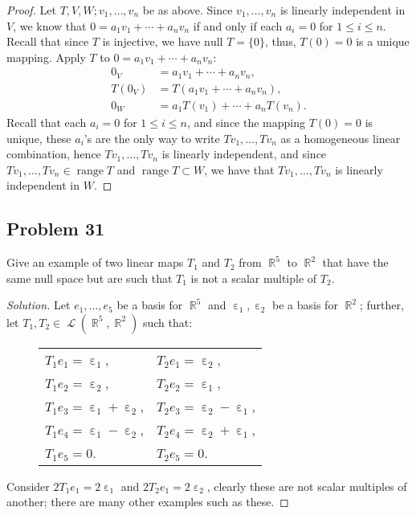 \documentclass[letterpaper, 12pt]{amsart}
\DeclareMathOperator{\R}{\mathbb{R}}
\renewcommand{\null}{\text{null }}
\DeclareMathOperator{\range}{\text{range }}
\DeclareMathOperator{\Ell}{\mathscr{L}}
\DeclareMathOperator{\ep}{\varepsilon}
\theoremstyle{definition}  %
\begin{document}
		\begin{proof}
		Let $T, V, W; v_{1}, \dots, v_{n}$ be as above.
		Since $v_{1}, \dots, v_{n}$ is linearly independent in $V$, we know that $0 = a_{1}v_{1} + \cdots + a_{n}v_{n}$ if and only if each $a_{i} = 0$ for $1 \leq i \leq n$.
		Recall that since $T$ is injective, we have $\null T = \{ 0 \}$, thus, $T(0) = 0$ is a unique mapping.
		Apply $T$ to $0 = a_{1}v_{1} + \cdots + a_{n}v_{n}$:
			\begin{align*}
				0_{V} &= a_{1}v_{1} + \cdots + a_{n}v_{n}, \\
				T(0_{V}) &= T(a_{1}v_{1} + \cdots + a_{n}v_{n}), \\
				0_{W} &= a_{1}T(v_{1}) + \cdots + a_{n}T(v_{n}).
			\end{align*}
		Recall that each $a_{i} = 0$ for $1 \leq i \leq n$, and since the mapping $T(0)=0$ is unique, these $a_{i}$'s are the only way to write $Tv_{1}, \dots, Tv_{n}$ as a homogeneous linear combination, hence $Tv_{1}, \dots, Tv_{n}$ is linearly independent, and since $Tv_{1}, \dots, Tv_{n} \in \range T$ and $\range T \subset W$, we have that $Tv_{1}, \dots, Tv_{n}$ is linearly independent in $W$.
		\end{proof}

		\subsection*{Problem 31}
		Give an example of two linear maps $T_{1}$ and $T_{2}$ from $\R^{5}$ to $\R^{2}$ that have the same null space but are such that $T_{1}$ is not a scalar multiple of $T_{2}$.

		\begin{proof}[Solution]
		Let $e_{1}, \dots, e_{5}$ be a basis for $\R^{5}$ and $\ep_{1}, \ep_{2}$ be a basis for $\R^{2}$; further, let $T_{1}, T_{2} \in \Ell(\R^{5}, \R^{2})$ such that:
			\begin{figure}[h]
				\begin{tabular}{ll}
					$T_{1}e_{1} = \ep_{1}$, & $T_{2}e_{1} = \ep_{2}$, \\
					$T_{1}e_{2} = \ep_{2}$, & $T_{2}e_{2} = \ep_{1}$, \\
					$T_{1}e_{3} = \ep_{1} + \ep_{2}$, & $T_{2}e_{3} = \ep_{2} - \ep_{1}$, \\
					$T_{1}e_{4} = \ep_{1} - \ep_{2}$, & $T_{2}e_{4} = \ep_{2} + \ep_{1}$, \\
					$T_{1}e_{5} = 0$. & $T_{2}e_{5} = 0$.
				\end{tabular}
			\end{figure}

		Consider $2T_{1}e_{1} = 2\ep_{1}$ and $2T_{2}e_{1} = 2\ep_{2}$, clearly these are not scalar multiples of another; there are many other examples such as these.
		\end{proof}
\end{document}
